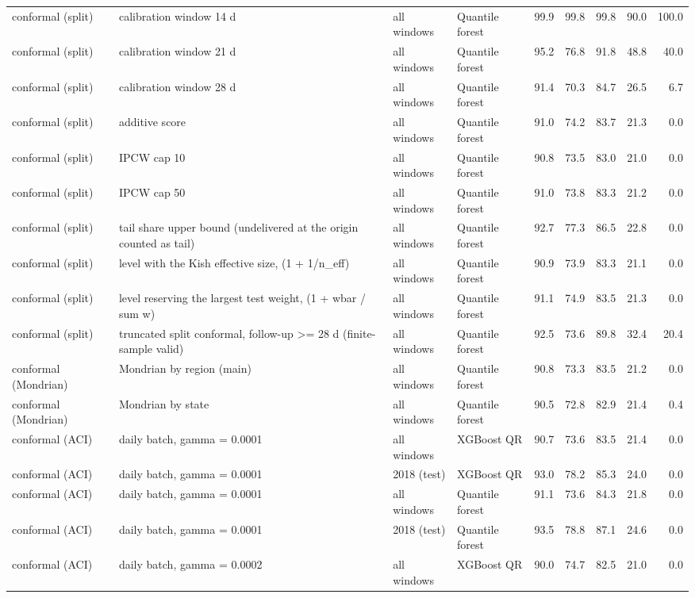 \begin{table}[!htbp]
{\begin{tabular}{llllrrrrr}
conformal (split) & calibration window 14 d & all windows & Quantile forest & 99.9 & 99.8 & 99.8 & 90.0 & 100.0 \\
conformal (split) & calibration window 21 d & all windows & Quantile forest & 95.2 & 76.8 & 91.8 & 48.8 & 40.0 \\
conformal (split) & calibration window 28 d & all windows & Quantile forest & 91.4 & 70.3 & 84.7 & 26.5 & 6.7 \\
conformal (split) & additive score & all windows & Quantile forest & 91.0 & 74.2 & 83.7 & 21.3 & 0.0 \\
conformal (split) & IPCW cap 10 & all windows & Quantile forest & 90.8 & 73.5 & 83.0 & 21.0 & 0.0 \\
conformal (split) & IPCW cap 50 & all windows & Quantile forest & 91.0 & 73.8 & 83.3 & 21.2 & 0.0 \\
conformal (split) & tail share upper bound (undelivered at the origin counted as tail) & all windows & Quantile forest & 92.7 & 77.3 & 86.5 & 22.8 & 0.0 \\
conformal (split) & level with the Kish effective size, (1 + 1/n\_eff) & all windows & Quantile forest & 90.9 & 73.9 & 83.3 & 21.1 & 0.0 \\
conformal (split) & level reserving the largest test weight, (1 + wbar / sum w) & all windows & Quantile forest & 91.1 & 74.9 & 83.5 & 21.3 & 0.0 \\
conformal (split) & truncated split conformal, follow-up >= 28 d (finite-sample valid) & all windows & Quantile forest & 92.5 & 73.6 & 89.8 & 32.4 & 20.4 \\
conformal (Mondrian) & Mondrian by region (main) & all windows & Quantile forest & 90.8 & 73.3 & 83.5 & 21.2 & 0.0 \\
conformal (Mondrian) & Mondrian by state & all windows & Quantile forest & 90.5 & 72.8 & 82.9 & 21.4 & 0.4 \\
conformal (ACI) & daily batch, gamma = 0.0001 & all windows & XGBoost QR & 90.7 & 73.6 & 83.5 & 21.4 & 0.0 \\
conformal (ACI) & daily batch, gamma = 0.0001 & 2018 (test) & XGBoost QR & 93.0 & 78.2 & 85.3 & 24.0 & 0.0 \\
conformal (ACI) & daily batch, gamma = 0.0001 & all windows & Quantile forest & 91.1 & 73.6 & 84.3 & 21.8 & 0.0 \\
conformal (ACI) & daily batch, gamma = 0.0001 & 2018 (test) & Quantile forest & 93.5 & 78.8 & 87.1 & 24.6 & 0.0 \\
conformal (ACI) & daily batch, gamma = 0.0002 & all windows & XGBoost QR & 90.0 & 74.7 & 82.5 & 21.0 & 0.0 \\

\end{tabular}}
\end{table}
